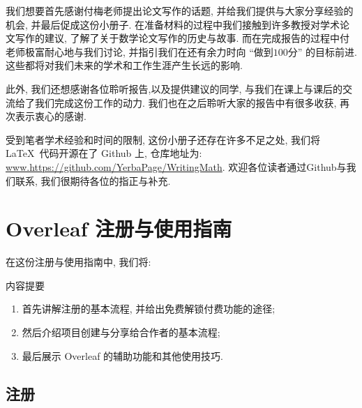 \documentclass{booki}
\begin{document}
我们想要首先感谢付梅老师提出论文写作的话题, 并给我们提供与大家分享经验的机会, 并最后促成这份小册子. 在准备材料的过程中我们接触到许多教授对学术论文写作的建议, 了解了关于数学论文写作的历史与故事. 而在完成报告的过程中付老师极富耐心地与我们讨论, 并指引我们在还有余力时向 {``}做到$100$分{''} 的目标前进. 这些都将对我们未来的学术和工作生涯产生长远的影响.

此外, 我们还想感谢各位聆听报告,以及提供建议的同学, 与我们在课上与课后的交流给了我们完成这份工作的动力. 我们也在之后聆听大家的报告中有很多收获, 再次表示衷心的感谢.

受到笔者学术经验和时间的限制, 这份小册子还存在许多不足之处, 我们将 \LaTeX \ 代码开源在了 Github 上, 仓库地址为: \url{www.https://github.com/YerbaPage/WritingMath}. 欢迎各位读者通过Github与我们联系, 我们很期待各位的指正与补充.

{\printbibliography[title = {参考文献}]}
\appendix
\chapter{Overleaf 注册与使用指南}\label{overleafGuide}
在这份注册与使用指南中, 我们将:

\begin{titledBox}{内容提要}
\begin{enumerate}
    \item 首先讲解注册的基本流程, 并给出免费解锁付费功能的途径;
    \item 然后介绍项目创建与分享给合作者的基本流程;
    \item 最后展示 Overleaf 的辅助功能和其他使用技巧.
\end{enumerate}
\end{titledBox}


\section{注册}\label{header-n2}
\end{document}
